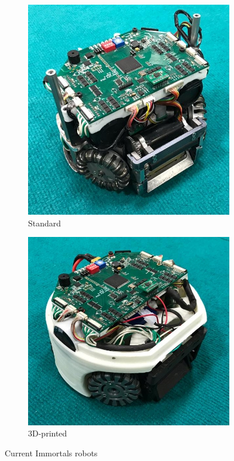 \documentclass[runningheads]{llncs}
\begin{document}
\begin{figure}
    \centering
    \begin{subfigure}[b]{0.45\textwidth}
         \centering
         \includegraphics[width=\textwidth]{images/std_robot.jpeg}
         \caption{Standard}
         \label{fig:robot_std}
    \end{subfigure}
    \hfill
    \begin{subfigure}[b]{0.5\textwidth}
        \centering
        \includegraphics[width=\textwidth]{images/printed_robot.jpeg}
        \caption{3D-printed}
        \label{fig:robot_printed}
    \end{subfigure}
    \caption{Current Immortals robots}
    \label{fig:robots}
\end{figure}
\end{document}
